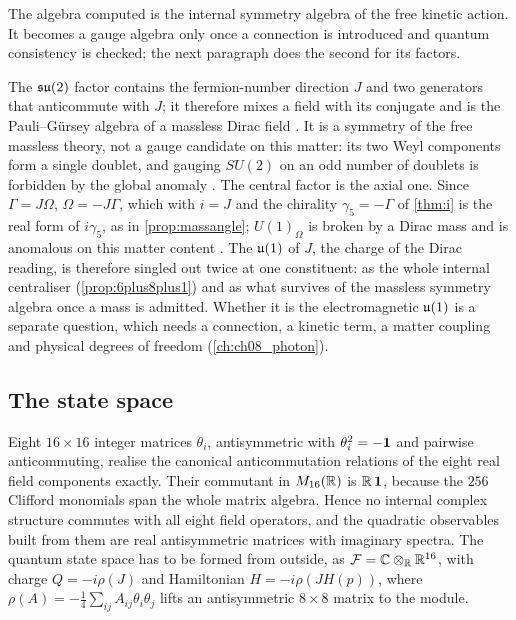 The algebra computed is the internal symmetry algebra of the free kinetic action. It becomes a gauge algebra only once a connection is
introduced and quantum consistency is checked; the next paragraph does the second for its factors.

The $\mathfrak{su}(2)$ factor contains the fermion-number direction $J$ and two generators that anticommute with $J$; it therefore mixes a field with
its conjugate and is the Pauli--G\"ursey algebra of a massless Dirac field \cite{Pauli57,Gursey58}. It is a symmetry of the free massless
theory, not a gauge candidate on this matter: its two Weyl components form a single doublet, and gauging $SU(2)$ on an odd number of
doublets is forbidden by the global anomaly \cite{Witten82}. The central factor is the axial one. Since $\Gamma=J\Omega$, $\Omega=-J\Gamma$,
which with $i=J$ and the chirality $\gamma_5=-\Gamma$ of \cref{thm:i} is the real form of $i\gamma_5$, as in \cref{prop:massangle}; $U(1)_\Omega$ is broken by a Dirac mass and is anomalous on this matter content \cite{Bilal,AlvarezGaumeWitten}.
The $\mathfrak{u}(1)$ of $J$, the charge of the Dirac reading, is therefore singled out twice at one constituent: as the whole internal centraliser
(\cref{prop:6plus8plus1}) and as what survives of the massless symmetry algebra once a mass is admitted. Whether it is the electromagnetic
$\mathfrak{u}(1)$ is a separate question, which needs a connection, a kinetic term, a matter coupling and physical degrees of freedom
(\cref{ch:ch08_photon}).

\subsection{The state space}

\begin{theorem}
\label{thm:module}
Eight $16\times16$ integer matrices $\theta_i$, antisymmetric with $\theta_i^2=-\mathbf 1$ and pairwise anticommuting, realise the canonical
anticommutation relations of the eight real field components exactly. Their commutant in $M_{16}(\mathbb{R})$ is $\mathbb{R}\,\mathbf 1$, because the $256$
Clifford monomials span the whole matrix algebra. Hence no internal complex structure commutes with all eight field operators, and the
quadratic observables built from them are real antisymmetric matrices with imaginary spectra. The quantum state space has to be formed
from outside, as $\mathcal F=\mathbb{C}\otimes_{\mathbb{R}}\mathbb{R}^{16}$, with charge $Q=-i\rho(J)$ and Hamiltonian $H=-i\rho(JH(p))$, where
$\rho(A)=-\tfrac14\sum_{ij}A_{ij}\theta_i\theta_j$ lifts an antisymmetric $8\times8$ matrix to the module.
\end{theorem}


